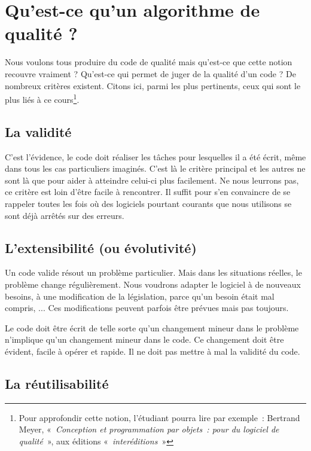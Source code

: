 \section{Qu'est-ce qu'un algorithme de qualité ?}

	{
	Nous voulons tous produire du code de qualité mais
	qu'est-ce que cette notion recouvre vraiment ?
	Qu'est-ce qui permet de juger de la qualité
	d'un code ? De nombreux critères existent. Citons ici,
	parmi les plus pertinents, ceux qui sont le plus liés à ce
	cours\footnote{Pour approfondir cette notion,
	l'étudiant pourra lire par exemple~: Bertrand Meyer,
	«~\textit{Conception et programmation par objets~: pour du logiciel de
	qualité}~», aux éditions «\textit{~interéditions~}»}. }

\subsection{La validité}

	{
	C'est l'évidence, le code doit
	réaliser les tâches pour lesquelles il a été écrit, même dans tous les
	cas particuliers imaginés. C'est là le critère
	principal et les autres ne sont là que pour aider à atteindre celui-ci
	plus facilement. Ne nous leurrons pas, ce critère est loin
	d'être facile à rencontrer. Il suffit pour
	s'en convaincre de se rappeler toutes les fois où des
	logiciels pourtant courants que nous utilisons se sont déjà arrêtés sur
	des erreurs.}

\subsection{L'extensibilité (ou évolutivité)}

	{
	Un code valide résout un problème particulier. Mais dans les situations
	réelles, le problème change régulièrement. Nous voudrons adapter le
	logiciel à de nouveaux besoins, à une modification de la législation,
	parce qu’un besoin était mal compris, ... Ces modifications peuvent
	parfois être prévues mais pas toujours.}

	{
	Le code doit être écrit de telle sorte qu'un changement
	mineur dans le problème n'implique
	qu'un changement mineur dans le code. Ce changement
	doit être évident, facile à opérer et rapide. Il ne doit pas mettre à
	mal la validité du code.}

\subsection{La réutilisabilité}

